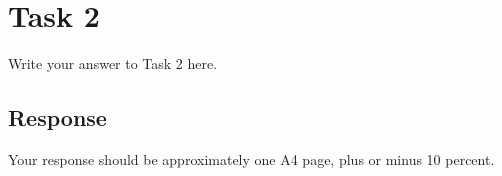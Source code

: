 
\section{Task 2}

Write your answer to Task 2 here.

\subsection{Response}

Your response should be approximately one A4 page, plus or minus 10 percent.